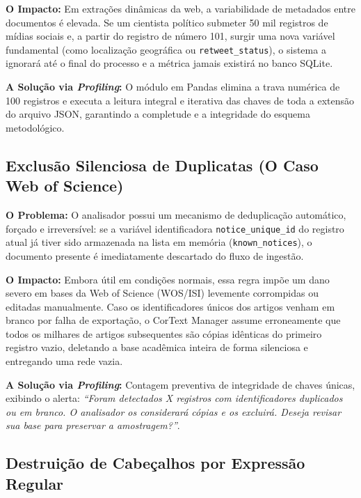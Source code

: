 \documentclass[
	oneside,
	a4paper,
	12pt,
	chapter=TITLE,
	section=TITLE,
	english,
	brazilian
]{abntex2}
\begin{document}
\begin{apendicesenv}
\textbf{O Impacto:} Em extrações dinâmicas da web, a variabilidade de metadados entre documentos é elevada. Se um cientista político submeter 50 mil registros de mídias sociais e, a partir do registro de número 101, surgir uma nova variável fundamental (como localização geográfica ou \texttt{retweet\_\allowbreak status}), o sistema a ignorará até o final do processo e a métrica jamais existirá no banco SQLite.

\textbf{A Solução via \textit{Profiling}:} O módulo em Pandas elimina a trava numérica de 100 registros e executa a leitura integral e iterativa das chaves de toda a extensão do arquivo JSON, garantindo a completude e a integridade do esquema metodológico.

\FloatBarrier
\subsection{Exclusão Silenciosa de Duplicatas (O Caso Web of Science)}\label{sec:exclusao_silenciosa_de_duplicatas_o_caso}


\textbf{O Problema:} O analisador possui um mecanismo de deduplicação automático, forçado e irreversível: se a variável identificadora \texttt{notice\_\allowbreak unique\_\allowbreak id} do registro atual já tiver sido armazenada na lista em memória (\texttt{known\_\allowbreak notices}), o documento presente é imediatamente descartado do fluxo de ingestão.

\textbf{O Impacto:} Embora útil em condições normais, essa regra impõe um dano severo em bases da Web of Science (WOS/ISI) levemente corrompidas ou editadas manualmente. Caso os identificadores únicos dos artigos venham em branco por falha de exportação, o CorText Manager assume erroneamente que todos os milhares de artigos subsequentes são cópias idênticas do primeiro registro vazio, deletando a base acadêmica inteira de forma silenciosa e entregando uma rede vazia.

\textbf{A Solução via \textit{Profiling}:} Contagem preventiva de integridade de chaves únicas, exibindo o alerta: \textit{``Foram detectados X registros com identificadores duplicados ou em branco. O analisador os considerará cópias e os excluirá. Deseja revisar sua base para preservar a amostragem?''}.

\FloatBarrier
\subsection{Destruição de Cabeçalhos por Expressão Regular}\label{sec:destruicao_de_cabecalhos_por_expressao_r}



\end{apendicesenv}
\end{document}
